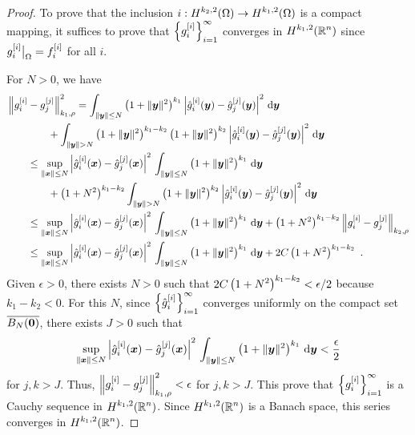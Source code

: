 \begin{proof}
  To prove that the inclusion
$\displaystyle i:H^{k_2,2}(\Omega) \to H^{k_1,2}(\Omega)$ is a
compact mapping, it suffices to prove that
$\displaystyle \left\{g_i^{[i]}\right\}_{i=1}^\infty$ converges in
$\displaystyle H^{k_1,2}(\mathbb{R}^n)$ since
$\displaystyle g_i^{[i]}\big|_{\Omega} = f_i^{[i]}$ for all $i$.

For $N>0$, we have
\begin{align*}
&\left\|g_i^{[i]} - g_j^{[j]} \right\|_{k_1,\rho}^2 =
\int_{\|\VEC{y}\|\leq N} \left(1+\|\VEC{y}\|^2\right)^{k_1}
\left| \hat{g}_i^{[i]}(\VEC{y}) - \hat{g}_j^{[j]}(\VEC{y})
\right|^2 \dx{\VEC{y}} \\
&\qquad \qquad +\int_{\|\VEC{y}\|> N} \left(1+\|\VEC{y}\|^2\right)^{k_1-k_2}
\left(1+\|\VEC{y}\|^2\right)^{k_2}
\left| \hat{g}_i^{[i]}(\VEC{y}) - \hat{g}_j^{[j]}(\VEC{y})
\right|^2 \dx{\VEC{y}} \\
&\qquad \leq \sup_{\|\VEC{x}\|\leq N}
\left| \hat{g}_i^{[i]}(\VEC{x}) - \hat{g}_j^{[j]}(\VEC{x}) \right|^2
\, \int_{\|\VEC{y}\|\leq N} \left(1+\|\VEC{y}\|^2\right)^{k_1}
\dx{\VEC{y}} \\
&\qquad \qquad + \left(1+N^2\right)^{k_1-k_2}
\int_{\|\VEC{y}\|> N} \left(1+\|\VEC{y}\|^2\right)^{k_2}
\left| \hat{g}_i^{[i]}(\VEC{y}) - \hat{g}_j^{[j]}(\VEC{y}) \right|^2
\dx{\VEC{y}} \\
&\qquad \leq \sup_{\|\VEC{x}\|\leq N}
\left| \hat{g}_i^{[i]}(\VEC{x}) - \hat{g}_j^{[j]}(\VEC{x}) \right|^2
\, \int_{\|\VEC{y}\|\leq N} \left(1+\|\VEC{y}\|^2\right)^{k_1}
\dx{\VEC{y}}
+ \left(1+N^2\right)^{k_1-k_2} \left\| g_i^{[i]}-g_j^{[j]}\right\|_{k_2,\rho} \\
&\qquad \leq \sup_{\|\VEC{x}\|\leq N}
\left| \hat{g}_i^{[i]}(\VEC{x}) - \hat{g}_j^{[j]}(\VEC{x}) \right|^2
\, \int_{\|\VEC{y}\|\leq N} \left(1+\|\VEC{y}\|^2\right)^{k_1}
\dx{\VEC{y}} +2C \left(1+N^2\right)^{k_1-k_2} \ .
\end{align*}
Given $\epsilon>0$, there exists $N>0$ such that
$\displaystyle 2C \left(1+N^2\right)^{k_1-k_2} < \epsilon/2$ because $k_1-k_2<0$.
For this $N$, since $\displaystyle \left\{ \hat{g}_i^{[i]} \right\}_{i=1}^\infty$
converges uniformly on the compact set $\overline{B_N({\bm{0}})}$,
there exists $J>0$ such that
\[
\sup_{\|{\bm{x}}\|\leq N}
\left| \hat{g}_i^{[i]}({\bm{x}}) - \hat{g}_j^{[j]}({\bm{x}}) \right|^2
\, \int_{\|{\bm{y}}\|\leq N} \left(1+\|{\bm{y}}\|^2\right)^{k_1}
\,\mathrm{d}{{\bm{y}}} < \frac{\epsilon}{2}
\]
for $j,k > J$.  Thus,
$\displaystyle \left\|g_i^{[i]} - g_j^{[j]}\right\|_{k_1,\rho}^2 < \epsilon$
for $j,k > J$.
This prove that $\displaystyle \left\{g_i^{[i]} \right\}_{i=1}^\infty$
is a Cauchy sequence in
$\displaystyle H^{k_1,2}(\mathbb{R}^n)$.  Since $\displaystyle H^{k_1,2}(\mathbb{R}^n)$
is a Banach space, this series converges in
$\displaystyle H^{k_1,2}(\mathbb{R}^n)$.
\end{proof}


